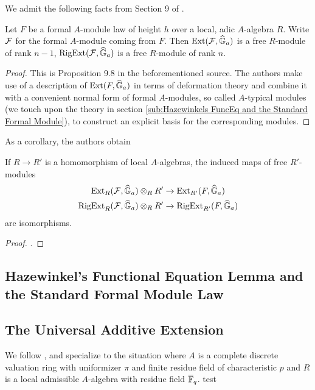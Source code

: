 \documentclass[../main.tex]{subfiles}
\begin{document}
We admit the following facts from Section 9 of \cite{hopkins1994equivariant}.
\begin{prop}\label{prop:InterestingSequenceStdMod}
  Let $F$ be a formal $A$-module law of height $h$ over a local, adic
  $A$-algebra $R$. Write $\mathcal{F}$ for the formal $A$-module coming from 
  $F$. Then $\operatorname{Ext}(\mathcal{F}, \widehat{\mathbb{G}}_a)$ is a free $R$-module of rank $n-1$, 
  $\operatorname {RigExt}(\mathcal{F}, \widehat{\mathbb{G}}_a)$ is a free $R$-module of rank $n$. 
\begin{proof}
  This is Proposition 9.8 in the beforementioned source. The authors make
  use of a description of $\operatorname{Ext}(F, \widehat{\mathbb{G}}_a)$ in terms of deformation theory
  and combine it with a convenient normal form of formal $A$-modules, so called
  $A$-typical modules (we touch upon the theory in section \ref{sub:Hazewinkels
  FuncEq and the Standard Formal Module}), to construct an explicit 
  basis for the corresponding modules. 
\end{proof}
\end{prop}
As a corollary, the authors obtain
\begin{lem}
  If $R \to R'$ is a homomorphism of local $A$-algebras, the induced maps 
  of free $R'$-modules
  \begin{gather*}
    \operatorname{Ext}_R(\mathcal{F}, \widehat{\mathbb{G}}_a) \otimes_R R' \to \operatorname{Ext}_{R'}(F, \widehat{\mathbb{G}}_a) \\
    \operatorname {RigExt}_R(\mathcal{F}, \widehat{\mathbb{G}}_a) \otimes_R R' \to \operatorname {RigExt}_{R'}(F, \widehat{\mathbb{G}}_a)
  \end{gather*}
  are isomorphisms.
\begin{proof}
  \cite[Corollary 9.13]{hopkins1994equivariant}.
\end{proof}
\end{lem}


\subsection{Hazewinkel's Functional Equation Lemma and the Standard Formal Module Law} %
\label{sub:Hazewinkels FuncEq and the Standard Formal Module}


\subsection{The Universal Additive Extension} %
\label{sub:The Universal Additive Extension}
We follow \cite[Section 11]{hopkins1994equivariant}, 
and specialize to the situation where $A$ is a complete discrete valuation ring
with uniformizer $\pi$ and finite residue field of characteristic $p$ and
$R$ is a local admissible $A$-algebra with residue field $\overline {\mathbb{F}}_q$.
test
\end{document}
